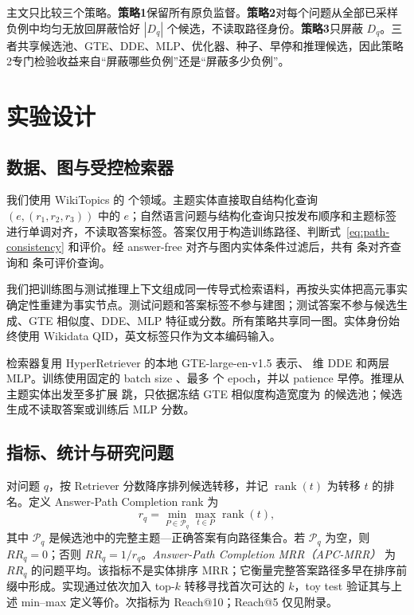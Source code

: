 \documentclass[sigconf,review,anonymous]{acmart}
\begin{document}
主文只比较三个策略。\textbf{策略1}保留所有原负监督。\textbf{策略2}对每个问题从全部已采样负例中均匀无放回屏蔽恰好 $|D_q|$ 个候选，不读取路径身份。\textbf{策略3}只屏蔽 $D_q$。三者共享候选池、GTE、DDE、MLP、优化器、种子、早停和推理候选，因此策略2专门检验收益来自``屏蔽哪些负例''还是``屏蔽多少负例''。

\section{实验设计}

\subsection{数据、图与受控检索器}

我们使用 WikiTopics 的 \DatasetCount{} 个领域。主题实体直接取自结构化查询 $(e,(r_1,r_2,r_3))$ 中的 $e$；自然语言问题与结构化查询只按发布顺序和主题标签进行单调对齐，不读取答案标签。答案仅用于构造训练路径、判断式~\eqref{eq:path-consistency} 和评价。经 answer-free 对齐与图内实体条件过滤后，共有 \AlignedQueryCount{} 条对齐查询和 \EligibleQueryCount{} 条可评价查询。

我们把训练图与测试推理上下文组成同一传导式检索语料，再按头实体把高元事实确定性重建为事实节点。测试问题和答案标签不参与建图；测试答案不参与候选生成、GTE 相似度、DDE、MLP 特征或分数。所有策略共享同一图。实体身份始终使用 Wikidata QID，英文标签只作为文本编码输入。

检索器复用 HyperRetriever 的本地 GTE-large-en-v1.5 表示、\DDEDimension{} 维 DDE 和两层 MLP。训练使用固定的 batch size \TrainingBatchSize、最多 \MaximumEpochs{} 个 epoch，并以 patience \EarlyStoppingPatience{} 早停。推理从主题实体出发至多扩展 \MaximumLogicalHops{} 跳，只依据冻结 GTE 相似度构造宽度为 \SelectedBeamWidth{} 的候选池；候选生成不读取答案或训练后 MLP 分数。

\subsection{指标、统计与研究问题}

对问题 $q$，按 Retriever 分数降序排列候选转移，并记 $\operatorname{rank}(t)$ 为转移 $t$ 的排名。定义 Answer-Path Completion rank 为
\begin{equation}
  r_q=\min_{P\in\mathcal P_q}\max_{t\in P}\operatorname{rank}(t),
\end{equation}
其中 $\mathcal P_q$ 是候选池中的完整主题---正确答案有向路径集合。若 $\mathcal P_q$ 为空，则 $RR_q=0$；否则 $RR_q=1/r_q$。\emph{Answer-Path Completion MRR（APC-MRR）} 为 $RR_q$ 的问题平均。该指标不是实体排序 MRR；它衡量完整答案路径多早在排序前缀中形成。实现通过依次加入 top-$k$ 转移寻找首次可达的 $k$，toy test 验证其与上述 min--max 定义等价。次指标为 Reach@10；Reach@5 仅见附录。
\end{document}
